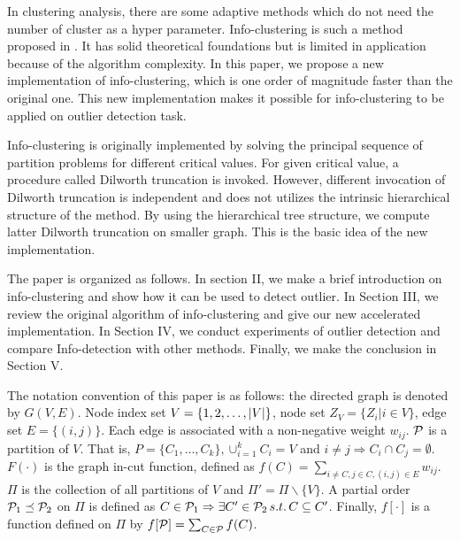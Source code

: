 \documentclass[runningheads]{llncs}
\begin{document}
In clustering analysis, there are some adaptive methods which do not need the number of cluster as a hyper parameter. Info-clustering is such a method proposed in \cite{RN1}. It has solid theoretical foundations but is limited in application because of the algorithm complexity. In this paper, we propose a new implementation of info-clustering, which is one order of magnitude faster than the original one. This new implementation makes it possible for info-clustering to be applied on outlier detection task. 

Info-clustering is originally implemented by solving the principal sequence of partition problems for different critical values. For given critical value, a procedure called Dilworth truncation is invoked. However, different invocation of Dilworth truncation is independent and does not utilizes the intrinsic hierarchical structure of the method. By using the hierarchical tree structure, we compute latter Dilworth truncation on smaller graph. This is the basic idea of the new implementation. 

The paper is organized as follows. In section II, we make a brief introduction on info-clustering and show how it can be used to detect outlier. In Section III, we review the original algorithm of info-clustering and give our new accelerated implementation. In Section IV, we conduct experiments of outlier detection and compare Info-detection with other methods. Finally, we make the conclusion in Section V.

The notation convention of this paper is as follows: the directed graph is denoted by $G(V, E)$. Node index set $V=\{1, 2,\dots, \abs{V}\}$, node set $Z_V=\{Z_i | i \in V\}$, edge set $E=\{(i, j)\}$. Each edge is associated with a non-negative weight $w_{ij}$. $\P$ is a partition of $V$. That is, $P=\{C_1, \dots, C_k\}, \cup_{i=1}^k C_i=V$ and $i\neq j \Rightarrow C_i \cap C_j =\emptyset $. $F(\cdot)$ is the graph in-cut function, defined as $f(C)=\sum_{i \neq C, j\in C, (i,j) \in E} w_{ij}$. $\Pi$ is the collection of all partitions of $V$ and $\Pi'=\Pi\backslash\{V\}$. A partial order $ \P_1 \preceq \P_2$ on $\Pi$ is defined as
$C \in \P_1 \Rightarrow \exists C' \in \P_2 \, s.t. \, C \subseteq C'$.
Finally, $f[\cdot]$ is a function defined on $\Pi$ by $f[\P]=\sum_{C\in \P}f(C)$.
\end{document}
